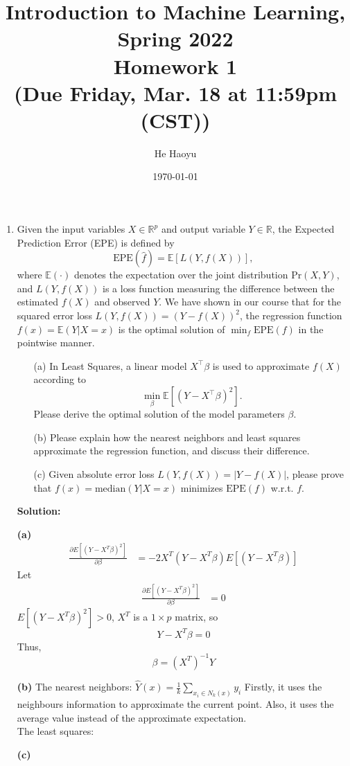 \documentclass[10pt]{article}
\author{He Haoyu}
\begin{document}
\date{\today}
\title{Introduction to Machine Learning, Spring 2022 \\
	Homework 1\\
	\small (Due Friday, Mar. 18 at 11:59pm (CST))}
\maketitle
\begin{enumerate}[1.]


	\item {} Given the input variables $X \in \mathbb{R}^p$ and output variable $Y \in \mathbb{R}$, the Expected Prediction Error (EPE) is defined by
	      \begin{equation}
		      \text{EPE}(\hat{f}) = \mathbb{E}[L(Y,f(X))],
	      \end{equation}
	      where $\mathbb{E}(\cdot)$ denotes the expectation over the joint distribution $\text{Pr}(X,Y)$, and $L(Y,f(X))$ is a loss function measuring the difference between the estimated $f(X)$ and observed $Y$.
	      We have shown in our course that for the squared error loss $L(Y,f(X))=(Y-f(X))^2$, the regression function $f(x) = \mathbb{E}(Y|X=x)$
	      is the optimal solution of $\min_f \text{EPE}(f)$ in the pointwise manner.
	      \begin{itemize}
		      \item[(a)] In Least Squares, a linear model $X^\top \beta$ is used to approximate $f(X)$ according to
		            \begin{equation}
			            \min_\beta  \mathbb{E}[(Y-X^\top \beta)^2].
		            \end{equation}
		            Please derive the optimal solution of the model parameters $\beta$.~
		      \item[(b)] Please explain how the nearest neighbors and least squares approximate the regression function, and discuss their difference.~
		      \item[(c)] Given absolute error loss $L(Y,f(X))=|Y-f(X)|$, please prove that $f(x) = \text{median}(Y|X=x)$ minimizes $\text{EPE}(f)$ w.r.t. $f$.~
	      \end{itemize}


\textbf{Solution:}
	\item[\textbf{(a)}] 
	$$
	\begin{aligned}
	\frac{\partial E[(Y-X^T\beta)^2]}{\partial \beta} &= -2X^T(Y-X^T\beta)E[(Y-X^T\beta)] 
	\end{aligned} 
	$$
	Let 
	$$
	\begin{aligned}
	\frac{\partial E[(Y-X^T\beta)^2]}{\partial \beta} &= 0
	\end{aligned} 
	$$
	$E[(Y-X^T\beta)^2]>0$, $X^T$ is a $1\times p$ matrix, so
	$$Y-X^T\beta =0$$
	Thus,
		$$\beta = (X^T)^{-1}Y$$
	\item[\textbf{(b)}] The nearest neighbors: $\hat{Y}(x)=\frac{1}{k}\sum_{x_i\in N_k(x)}y_i$
		  Firstly, it uses the neighbours information to approximate the current point. Also, it uses the average value instead of the approximate expectation.
		  \\The least squares: 
	\item[\textbf{(c)}] 
			

\end{enumerate}
\end{document}
